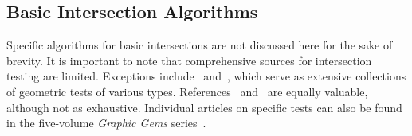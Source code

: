 
\subsection{Basic Intersection Algorithms}

Specific algorithms for basic intersections are not discussed here for the sake of brevity. It is important to note that comprehensive sources for intersection testing are limited. Exceptions include~\cite{schneider2002geometric} and~\cite{eberly2020robust}, which serve as extensive collections of geometric tests of various types. References~\cite{ericson2004realtime} and~\cite{vandenbergen2003collision} are equally valuable, although not as exhaustive. Individual articles on specific tests can also be found in the five-volume \emph{Graphic Gems} series~\cite{glassner1990graphics, arvo1991graphics, kirk1992graphics, heckbert1994graphics, paeth1995graphics}.

